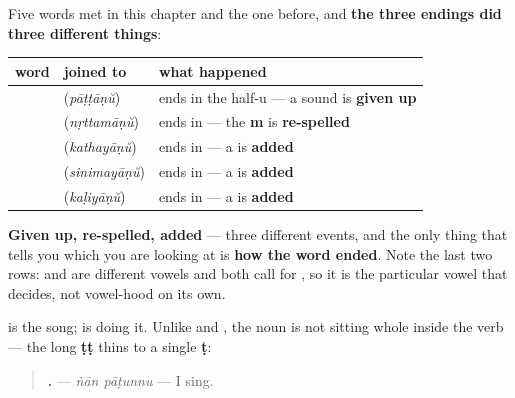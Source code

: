 \begin{grammarlens}[title={Grammar Lens: three endings, three different events}]
Five words met \textbf{} in this chapter and the one before, and \textbf{the three endings did three different things}:

\noindent
\begin{tabularx}{\linewidth}{@{}>{\raggedright\arraybackslash}X>{\raggedright\arraybackslash}X>{\raggedright\arraybackslash}X@{}}
\toprule
\textbf{word} & \textbf{joined to \textbf{\ml{ആണ്}}} & \textbf{what happened} \\
\midrule
\textbf{\ml{പാട്ട്}} & \textbf{\ml{പാട്ടാണ്}} (\emph{pāṭṭāṇŭ}) & ends in the half-u — a sound is \textbf{given up} \\
\textbf{\ml{നൃത്തം}} & \textbf{\ml{നൃത്തമാണ്}} (\emph{nṛttamāṇŭ}) & ends in \textbf{\ml{ം}} — the \textbf{m} is \textbf{re-spelled} \\
\textbf{\ml{കഥ}} & \textbf{\ml{കഥയാണ്}} (\emph{kathayāṇŭ}) & ends in \textbf{\ml{അ}} — a \textbf{\ml{യ}} is \textbf{added} \\
\textbf{\ml{സിനിമ}} & \textbf{\ml{സിനിമയാണ്}} (\emph{sinimayāṇŭ}) & ends in \textbf{\ml{അ}} — a \textbf{\ml{യ}} is \textbf{added} \\
\textbf{\ml{കളി}} & \textbf{\ml{കളിയാണ്}} (\emph{kaḷiyāṇŭ}) & ends in \textbf{\ml{ഇ}} — a \textbf{\ml{യ}} is \textbf{added} \\
\bottomrule
\end{tabularx}

\textbf{Given up, re-spelled, added} — three different events, and the only thing that tells you which you are looking at is \textbf{how the word ended}. Note the last two rows: \textbf{} and \textbf{} are different vowels and both call for \textbf{}, so it is the particular vowel that decides, not vowel-hood on its own.
\end{grammarlens}

\begin{grammarlens}[title={What you've built}]
\textbf{} is the song; \textbf{} is doing it. Unlike \textbf{} and \textbf{}, the noun is not sitting whole inside the verb — the long \textbf{ṭṭ} thins to a single \textbf{ṭ}:

\begin{quote}
\textbf{ .} — \emph{ñān pāṭunnu} — I sing.
\end{quote}
\end{grammarlens}

